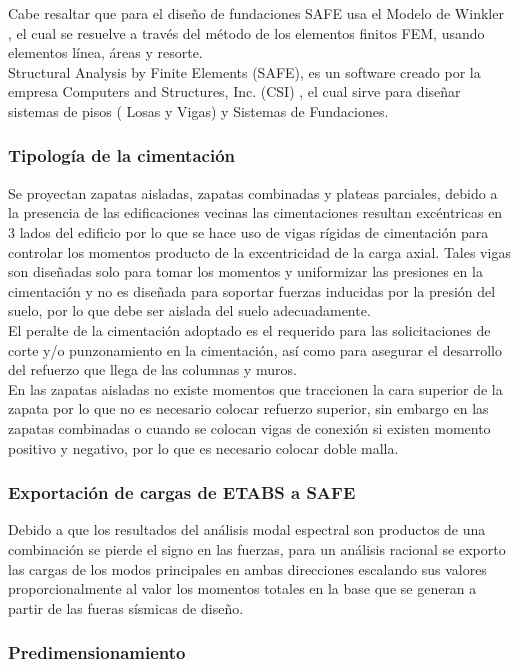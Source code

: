 Cabe resaltar que para el diseño de fundaciones SAFE usa el Modelo de Winkler , el cual se resuelve a través del método de los elementos finitos FEM, usando elementos línea, áreas y resorte.\\
Structural Analysis by Finite Elements (SAFE), es un software creado por la empresa Computers and Structures, Inc. (CSI) , el cual sirve para diseñar sistemas de pisos ( Losas y Vigas) y Sistemas de Fundaciones.

\subsubsection{Tipología de la cimentación}
Se proyectan zapatas aisladas, zapatas combinadas y plateas parciales, debido a la presencia de las edificaciones vecinas las cimentaciones resultan excéntricas en 3 lados del edificio por lo que se hace uso de vigas rígidas de cimentación para controlar los momentos producto de la excentricidad de la carga axial. Tales vigas son diseñadas solo para tomar los momentos y uniformizar las presiones en la cimentación y no es diseñada para soportar fuerzas inducidas por la presión del suelo, por lo que debe ser aislada del suelo adecuadamente.\\
El peralte de la cimentación adoptado es el requerido para las solicitaciones de corte y/o punzonamiento en la cimentación, así como para asegurar el desarrollo del refuerzo que llega de las columnas y muros.\\
En las zapatas aisladas no existe momentos que traccionen la cara superior de la zapata por lo que no es necesario colocar refuerzo superior, sin embargo en las zapatas combinadas o cuando se colocan vigas de conexión si existen momento positivo y negativo, por lo que es necesario colocar doble malla.

\subsubsection{Exportación de cargas de ETABS a SAFE}
Debido a que los resultados del análisis modal espectral son productos de una combinación se pierde el signo en las fuerzas, para un análisis racional se exporto las cargas de los modos principales en ambas direcciones escalando sus valores proporcionalmente al valor los momentos totales en la base que se generan a partir de las fueras sísmicas de diseño.

\subsubsection{Predimensionamiento}

